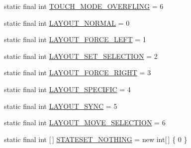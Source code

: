 \begin{DoxyCompactItemize}
\item 
static final int \hyperlink{classit_1_1sephiroth_1_1android_1_1library_1_1widget_1_1_abs_h_list_view_adab59e0d80449d045bd4e3d5588c6673}{T\+O\+U\+C\+H\+\_\+\+M\+O\+D\+E\+\_\+\+O\+V\+E\+R\+F\+L\+I\+NG} = 6
\item 
static final int \hyperlink{classit_1_1sephiroth_1_1android_1_1library_1_1widget_1_1_abs_h_list_view_ab4e383b1104afa61becc46878c23a255}{L\+A\+Y\+O\+U\+T\+\_\+\+N\+O\+R\+M\+AL} = 0
\item 
static final int \hyperlink{classit_1_1sephiroth_1_1android_1_1library_1_1widget_1_1_abs_h_list_view_ad8bb6cd6113fd72f89ddb973e60a4b5d}{L\+A\+Y\+O\+U\+T\+\_\+\+F\+O\+R\+C\+E\+\_\+\+L\+E\+FT} = 1
\item 
static final int \hyperlink{classit_1_1sephiroth_1_1android_1_1library_1_1widget_1_1_abs_h_list_view_a2e0c9f1e4ec6bde691723e9765903153}{L\+A\+Y\+O\+U\+T\+\_\+\+S\+E\+T\+\_\+\+S\+E\+L\+E\+C\+T\+I\+ON} = 2
\item 
static final int \hyperlink{classit_1_1sephiroth_1_1android_1_1library_1_1widget_1_1_abs_h_list_view_a165258ff58c28b7b6983b41c8d09bdea}{L\+A\+Y\+O\+U\+T\+\_\+\+F\+O\+R\+C\+E\+\_\+\+R\+I\+G\+HT} = 3
\item 
static final int \hyperlink{classit_1_1sephiroth_1_1android_1_1library_1_1widget_1_1_abs_h_list_view_a90d64ec2cec9f5c6c8956f8a2744a451}{L\+A\+Y\+O\+U\+T\+\_\+\+S\+P\+E\+C\+I\+F\+IC} = 4
\item 
static final int \hyperlink{classit_1_1sephiroth_1_1android_1_1library_1_1widget_1_1_abs_h_list_view_a0c7960c310cbcc9b7fc6f9d033a2d902}{L\+A\+Y\+O\+U\+T\+\_\+\+S\+Y\+NC} = 5
\item 
static final int \hyperlink{classit_1_1sephiroth_1_1android_1_1library_1_1widget_1_1_abs_h_list_view_ab27a023321ce6696992dcf4db3b64509}{L\+A\+Y\+O\+U\+T\+\_\+\+M\+O\+V\+E\+\_\+\+S\+E\+L\+E\+C\+T\+I\+ON} = 6
\item 
static final int \mbox{[}$\,$\mbox{]} \hyperlink{classit_1_1sephiroth_1_1android_1_1library_1_1widget_1_1_abs_h_list_view_a9dc4ae2e149aa03f673486a60bdbcd15}{S\+T\+A\+T\+E\+S\+E\+T\+\_\+\+N\+O\+T\+H\+I\+NG} = new int\mbox{[}$\,$\mbox{]} \{ 0 \}
\end{DoxyCompactItemize}
